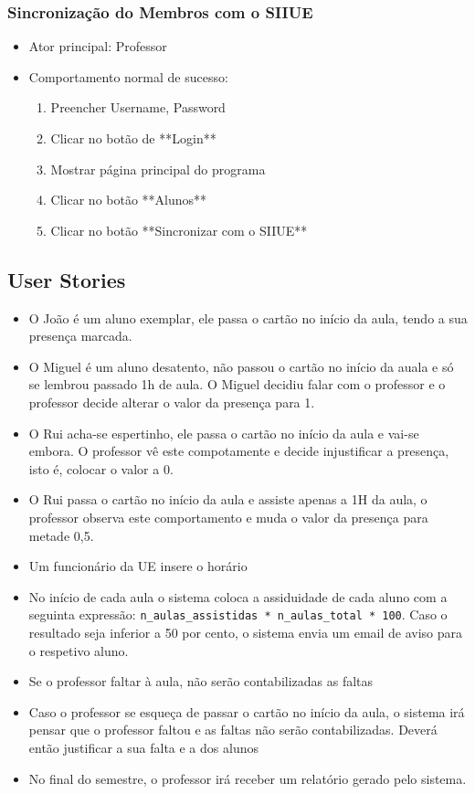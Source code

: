 \documentclass[11pt]{article}   %
\begin{document}
\subsubsection{Sincronização do Membros com o SIIUE} 

\begin{itemize}

    \item Ator principal: Professor
    \item Comportamento normal de sucesso:
    \begin{enumerate}
  
        \item Preencher Username, Password
        \item Clicar no botão de **Login**
        \item Mostrar página principal do programa
        \item Clicar no botão **Alunos**
        \item Clicar no botão **Sincronizar com o SIIUE**
    \end{enumerate} 
\end{itemize}

\subsection{User Stories}
\begin{itemize}
    \item O João é um aluno exemplar, ele passa o cartão no início da aula, tendo a sua presença marcada.
    \item O Miguel é um aluno desatento, não passou o cartão no início da auala e só se lembrou passado 1h de aula. O Miguel decidiu falar com o professor e o professor decide alterar o valor da presença para 1.
    \item O Rui acha-se espertinho, ele passa o cartão no início da aula e vai-se embora. O professor vê este compotamente e decide injustificar a presença, isto é, colocar o valor a 0.
    \item O Rui passa o cartão no início da aula e assiste apenas a 1H da aula, o professor observa este comportamento e muda o valor da presença para metade 0,5.
    \item Um funcionário da UE insere o horário
    \item No início de cada aula o sistema coloca a assiduidade de cada aluno com a seguinta expressão: \verb|n_aulas_assistidas * n_aulas_total * 100|. Caso o resultado seja inferior a 50 por cento, o sistema envia um email de aviso para o respetivo aluno.
    \item Se o professor faltar à aula, não serão contabilizadas as faltas
    \item Caso o professor se esqueça de passar o cartão no início da aula, o sistema irá pensar que o professor faltou e as faltas não serão contabilizadas. Deverá então justificar a sua falta e a dos alunos
    \item No final do semestre, o professor irá receber um relatório gerado pelo sistema.
\end{itemize}
\end{document}
